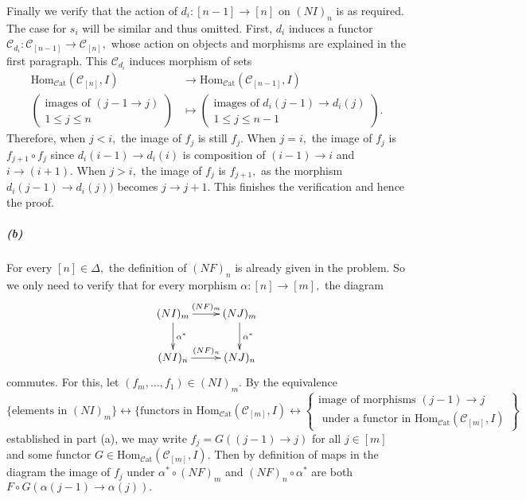 \documentclass{article}
\newcommand\cat{\mathcal{C}\mathrm{at}}
\newcommand\C{\mathcal{C}}
\begin{document}
Finally we verify that the action of $d_i\colon[n-1]\rightarrow[n]$ on $(NI)_n$ is as required. The case for $s_i$ will be similar and thus omitted. First, $d_i$ induces a functor $\mathcal{C}_{d_i}\colon\mathcal{C}_{[n-1]}\rightarrow\mathcal{C}_{[n]},$ whose action on objects and morphisms are explained in the first paragraph. This $\mathcal{C}_{d_i}$ induces morphism of sets
\begin{align*}
  \text{Hom}_{\cat}(\mathcal{C}_{[n]},I) & \rightarrow\text{Hom}_{\cat}(\mathcal{C}_{[n-1]},I) \\
  \left(\begin{gathered}\text{images of }(j-1\rightarrow j)\\
  1\leq j\leq n\end{gathered}\right) &\mapsto \left(\begin{gathered}\text{images of }d_i(j-1)\rightarrow d_i(j)\\
  1\leq j\leq n-1\end{gathered}\right).
\end{align*}
Therefore, when $j<i,$ the image of $f_j$ is still $f_j.$ When $j=i,$ the image of $f_j$ is $f_{j+1}\circ f_j$ since $d_i(i-1)\rightarrow d_i(i)$ is composition of $(i-1)\rightarrow i$ and $i\rightarrow(i+1).$ When $j>i,$ the image of $f_j$ is $f_{j+1},$ as the morphism $d_i(j-1)\rightarrow d_i(j))$ becomes $j\rightarrow j+1.$ This finishes the verification and hence the proof.

\subparagraph{(b)}For every $[n]\in\Delta,$ the definition of $(NF)_n$ is already given in the problem. So we only need to verify that for every morphism $\alpha\colon[n]\rightarrow[m],$ the diagram
\[\xymatrix{
(NI)_m\ar[r]^{(NF)_m}\ar[d]^{\alpha^*} & (NJ)_m\ar[d]^{\alpha^*}\\
(NI)_n\ar[r]^{(NF)_n} & (NJ)_n
}\]
commutes. For this, let $(f_m,\ldots,f_1)\in(NI)_m.$ By the equivalence
\begin{equation}\label{equivalence}
\{\text{elements in }(NI)_m\}\leftrightarrow\{\text{functors in }\text{Hom}_{\cat}(\C_{[m]},I)\leftrightarrow\left\{\begin{gathered}
\text{image of morphisms }(j-1)\rightarrow j\\
 \text{ under a functor in }\text{Hom}_{\cat}(\C_{[m]},I)\end{gathered}\right\}\end{equation}
established in part (a), we may write $f_j=G((j-1)\rightarrow j)$ for all $j\in[m]$ and some functor $G\in\text{Hom}_{\cat}(\C_{[m]},I).$ Then by definition of maps in the diagram the image of $f_j$ under  $\alpha^*\circ(NF)_m$ and $(NF)_n\circ\alpha^*$ are both $F\circ G(\alpha(j-1)\rightarrow\alpha(j)).$
\end{document}
